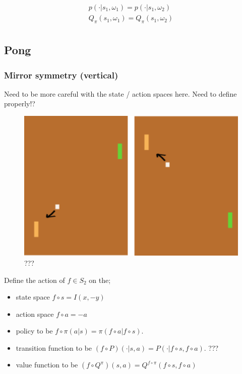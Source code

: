 \begin{align}
p(\cdot|s_1, \omega_1) = p(\cdot|s_1, \omega_2) \\
Q_{\pi}(s_1, \omega_1) = Q_{\pi}(s_1,\omega_2) \\
\end{align}


\subsection{Pong}

\subsubsection{Mirror symmetry (vertical)}

{\color{red}Need to be more careful with the state / action spaces here. Need to define properly!?}

\begin{figure}[!h]
\centering
\includegraphics[width=1\textwidth,height=0.25\textheight]{../../pictures/drawings/pong-vert-flip.png}
\caption{???}
\end{figure}


Define the action of $f \in S_2$ on the;

\begin{itemize}
	\tightlist
	\item state space $f \circ s = I(x, -y)$
	\item action space $f \circ a = -a$
 	\item policy to be $f \circ \pi(a | s) = \pi(f \circ a | f \circ s)$.
	\item transition function to be $(f \circ P)(\cdot | s, a) = P(\cdot| f \circ s, f \circ a)$. ???
	\item value function to be $(f \circ Q^{\pi})(s, a) = Q^{f \circ \pi}(f \circ s, f \circ a)$
\end{itemize}

